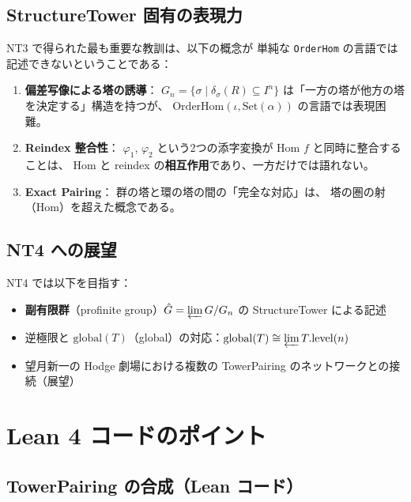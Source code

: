 \documentclass[a4paper,11pt]{ltjsarticle}
\theoremstyle{definition}
\theoremstyle{plain}
\theoremstyle{remark}
\newcommand{\glob}{\mathrm{global}}
\begin{document}
\subsection{StructureTower 固有の表現力}

NT3 で得られた最も重要な教訓は、以下の概念が
単純な \texttt{OrderHom} の言語では記述できないということである：

\begin{enumerate}
  \item \textbf{偏差写像による塔の誘導}：
        $G_n = \{\sigma \mid \delta_\sigma(R) \subseteq I^n\}$
        は「一方の塔が他方の塔を決定する」構造を持つが、
        $\mathrm{OrderHom}(\iota, \mathrm{Set}(\alpha))$ の言語では表現困難。
  \item \textbf{Reindex 整合性}：
        $\varphi_1$, $\varphi_2$ という2つの添字変換が Hom $f$ と同時に整合することは、
        Hom と reindex の\textbf{相互作用}であり、一方だけでは語れない。
  \item \textbf{Exact Pairing}：
        群の塔と環の塔の間の「完全な対応」は、
        塔の圏の射（Hom）を超えた概念である。
\end{enumerate}

\subsection{NT4 への展望}

NT4 では以下を目指す：
\begin{itemize}
  \item \textbf{副有限群}（profinite group）\(\hat{G} = \varprojlim G/G_n\) の
        StructureTower による記述
  \item 逆極限と \(\glob(T)\)（global）の対応：\(\glob(T) \cong \varprojlim T.\mathrm{level}(n)\)
  \item 望月新一の Hodge 劇場における複数の TowerPairing のネットワークとの接続（展望）
\end{itemize}

\appendix
\section{Lean 4 コードのポイント}

\subsection{TowerPairing の合成（Lean コード）}
\end{document}
